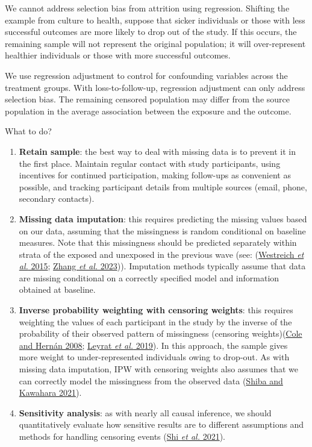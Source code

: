 \documentclass[
  singlecolumn]{article}
\begin{document}
We cannot address selection bias from attrition using regression.
Shifting the example from culture to health, suppose that sicker
individuals or those with less successful outcomes are more likely to
drop out of the study. If this occurs, the remaining sample will not
represent the original population; it will over-represent healthier
individuals or those with more successful outcomes.

We use regression adjustment to control for confounding variables across
the treatment groups. With loss-to-follow-up, regression adjustment can
only address selection bias. The remaining censored population may
differ from the source population in the average association between the
exposure and the outcome.

What to do?

\begin{enumerate}
\def\labelenumi{\arabic{enumi}.}
\item
  \textbf{Retain sample}: the best way to deal with missing data is to
  prevent it in the first place. Maintain regular contact with study
  participants, using incentives for continued participation, making
  follow-ups as convenient as possible, and tracking participant details
  from multiple sources (email, phone, secondary contacts).
\item
  \textbf{Missing data imputation}: this requires predicting the missing
  values based on our data, assuming that the missingness is random
  conditional on baseline measures. Note that this missingness should be
  predicted separately within strata of the exposed and unexposed in the
  previous wave (see: (\protect\hyperlink{ref-westreich2015}{Westreich
  \emph{et al.} 2015}; \protect\hyperlink{ref-zhang2023}{Zhang \emph{et
  al.} 2023})). Imputation methods typically assume that data are
  missing conditional on a correctly specified model and information
  obtained at baseline.
\item
  \textbf{Inverse probability weighting with censoring weights}: this
  requires weighting the values of each participant in the study by the
  inverse of the probability of their observed pattern of missingness
  (censoring weights)(\protect\hyperlink{ref-cole2008}{Cole and Hernán
  2008}; \protect\hyperlink{ref-leyrat2019}{Leyrat \emph{et al.} 2019}).
  In this approach, the sample gives more weight to under-represented
  individuals owing to drop-out. As with missing data imputation, IPW
  with censoring weights also assumes that we can correctly model the
  missingness from the observed data
  (\protect\hyperlink{ref-shiba2021}{Shiba and Kawahara 2021}).
\item
  \textbf{Sensitivity analysis}: as with nearly all causal inference, we
  should quantitatively evaluate how sensitive results are to different
  assumptions and methods for handling censoring events
  (\protect\hyperlink{ref-shi2021}{Shi \emph{et al.} 2021}).
\end{enumerate}
\end{document}
